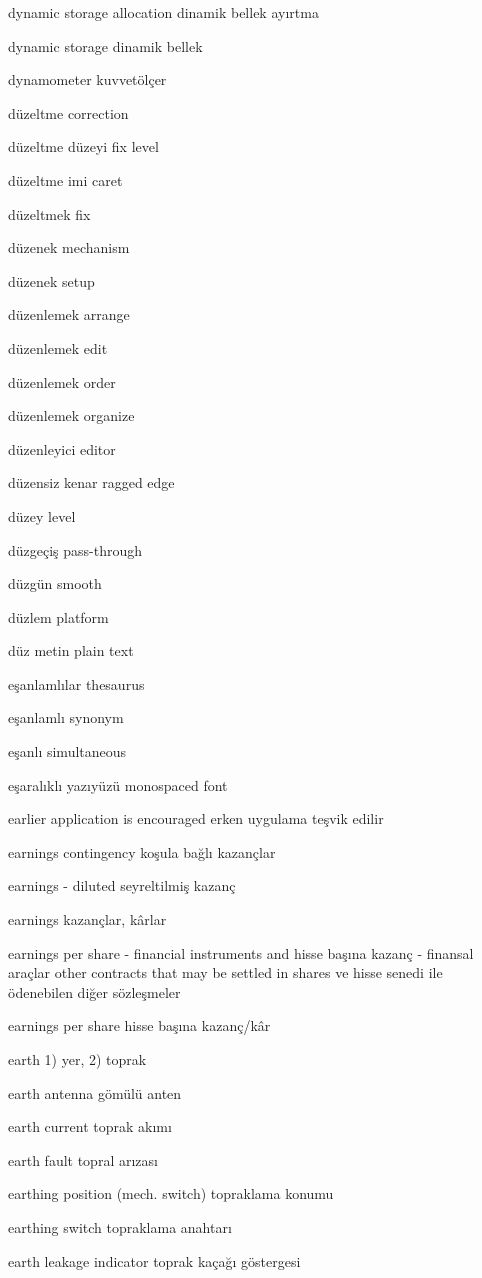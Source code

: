 \documentclass[12pt,fleqn]{article}\usepackage{../../common}
\begin{document}
dynamic storage allocation dinamik bellek ayırtma

dynamic storage dinamik bellek

dynamometer kuvvetölçer

düzeltme correction

düzeltme düzeyi fix level

düzeltme imi caret

düzeltmek fix

düzenek mechanism

düzenek setup

düzenlemek arrange

düzenlemek edit

düzenlemek order

düzenlemek organize

düzenleyici editor

düzensiz kenar ragged edge

düzey level

düzgeçiş pass-through

düzgün smooth

düzlem platform

düz metin plain text

eşanlamlılar thesaurus

eşanlamlı synonym

eşanlı simultaneous

eşaralıklı yazıyüzü monospaced font

earlier application is encouraged erken uygulama teşvik edilir

earnings contingency koşula bağlı kazançlar

earnings - diluted seyreltilmiş kazanç

earnings kazançlar, kârlar

earnings per share - financial instruments and hisse başına kazanç - finansal araçlar other contracts that may be settled in shares ve hisse senedi ile ödenebilen diğer sözleşmeler

earnings per share hisse başına kazanç/kâr

earth 1) yer, 2) toprak

earth antenna gömülü anten

earth current toprak akımı

earth fault topral arızası

earthing position (mech. switch) topraklama konumu

earthing switch topraklama anahtarı

earth leakage indicator toprak kaçağı göstergesi
\end{document}
